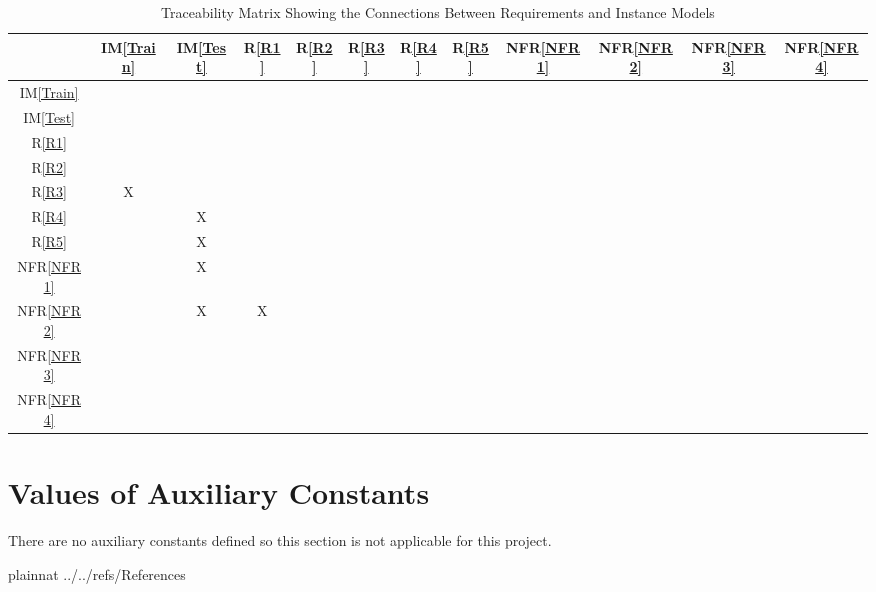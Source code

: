 \documentclass[12pt]{article}
\newcommand{\iref}[1]{IM\ref{#1}}
\newcommand{\rref}[1]{R\ref{#1}}
\newcommand{\nfrref}[1]{NFR\ref{#1}}
\begin{document}
\begin{table}[h!]
\centering
\begin{tabular}{|c|c|c|c|c|c|c|c|c|c|c|c|}
\hline
	& \iref{Train}& \iref{Test}& \rref{R1}& \rref{R2}& \rref{R3}& \rref{R4}& \rref{R5} & \nfrref{NFR1} & \nfrref{NFR2} & \nfrref{NFR3} & \nfrref{NFR4} \\
\hline
\iref{Train}    & & & & & & & & & & &  \\ \hline
\iref{Test}    & & & & & & & & & & &  \\ \hline
\rref{R1}     & & & & & & & & & & & \\ \hline
\rref{R2}     & & & & & & & & & & & \\ \hline
\rref{R3}     & X & & & & & & & & & &\\ \hline
\rref{R4}     & & X & & & & & & & & &\\ \hline
\rref{R5}     & & X & & & & & & & & &\\ \hline
\nfrref{NFR1}   & & X & & & & & & & & & \\ \hline
\nfrref{NFR2}   & & X & X & & & & & & & &\\ \hline 
\nfrref{NFR3}   & & & & & & & & & & &\\ \hline
\nfrref{NFR4}   & & & & & & & & & & &\\ 
\hline
\end{tabular}
\caption{Traceability Matrix Showing the Connections Between Requirements and Instance Models}
\label{Table:R_trace}
\end{table}

\section{Values of Auxiliary Constants}
There are no auxiliary constants defined so this section is not applicable for this project.

\newpage

 {plainnat}
 {../../refs/References}
\end{document}
